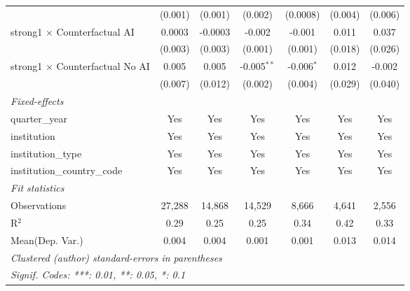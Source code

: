 \begin{tabular}{lcccccc}
                                          & (0.001)       & (0.001)       & (0.002)       & (0.0008)     & (0.004)       & (0.006)\\   
   strong1 $\times$ Counterfactual AI     & 0.0003        & -0.0003       & -0.002        & -0.001       & 0.011         & 0.037\\   
                                          & (0.003)       & (0.003)       & (0.001)       & (0.001)      & (0.018)       & (0.026)\\   
   strong1 $\times$ Counterfactual No AI  & 0.005         & 0.005         & -0.005$^{**}$ & -0.006$^{*}$ & 0.012         & -0.002\\   
                                          & (0.007)       & (0.012)       & (0.002)       & (0.004)      & (0.029)       & (0.040)\\   
   \midrule
   \emph{Fixed-effects}\\
   quarter\_year                          & Yes           & Yes           & Yes           & Yes          & Yes           & Yes\\  
   institution                            & Yes           & Yes           & Yes           & Yes          & Yes           & Yes\\  
   institution\_type                      & Yes           & Yes           & Yes           & Yes          & Yes           & Yes\\  
   institution\_country\_code             & Yes           & Yes           & Yes           & Yes          & Yes           & Yes\\  
   \midrule
   \emph{Fit statistics}\\
   Observations                           & 27,288        & 14,868        & 14,529        & 8,666        & 4,641         & 2,556\\  
   R$^2$                                  & 0.29          & 0.25          & 0.25          & 0.34         & 0.42          & 0.33\\  
Mean(Dep. Var.) & 0.004 & 0.004 & 0.001 & 0.001 & 0.013 & 0.014 \\
   \midrule \midrule
   \multicolumn{7}{l}{\emph{Clustered (author) standard-errors in parentheses}}\\
   \multicolumn{7}{l}{\emph{Signif. Codes: ***: 0.01, **: 0.05, *: 0.1}}\\
\end{tabular}
\par\endgroup

